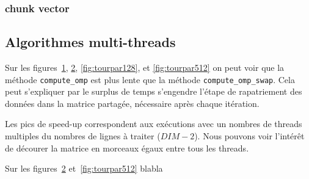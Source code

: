 \subsubsection{chunk vector}

\subsection{Algorithmes multi-threads}

Sur les figures~\ref{fig:homopar128}, \ref{fig:homopar512},
\ref{fig:tourpar128}, et \ref{fig:tourpar512} on peut voir que la
méthode \texttt{compute\_omp} est plus lente que la méthode
\texttt{compute\_omp\_swap}. Cela peut s'expliquer par le surplus de
temps s'engendre l'étape de rapatriement des données dans la matrice
partagée, nécessaire après chaque itération.
\medskip

Les pics de speed-up correspondent aux exécutions avec un nombres de
threads multiples du nombres de lignes à traiter ($DIM-2$). Nous
pouvons voir l'intérêt de décourer la matrice en morceaux égaux entre
tous les threads.
\medskip

Sur les figures~\ref{fig:homopar512} et~\ref{fig:tourpar512} blabla

\begin{figure}[!ht]
  \caption{}
  \label{fig:homopar128}
\end{figure}

\begin{figure}[!ht]
  \caption{}
  \label{fig:homopar512}
\end{figure}

